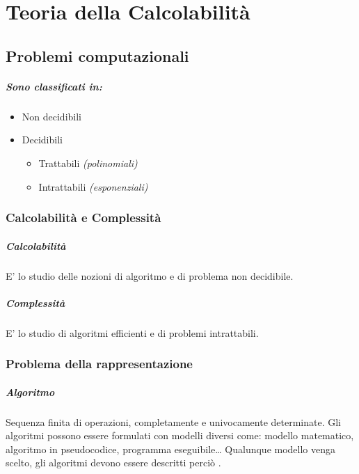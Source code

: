 \chapter{Teoria della Calcolabilità}
\section{Problemi computazionali}
\paragraph{Sono classificati in:}
\begin{itemize}
    \item Non decidibili
    \item Decidibili
    \begin{itemize}
        \item Trattabili \textit{(polinomiali)}
        \item Intrattabili \textit{(esponenziali)}
    \end{itemize}
\end{itemize}
\subsection{Calcolabilità e Complessità}
\paragraph{Calcolabilità} E' lo studio delle nozioni di algoritmo e di problema non decidibile.
\paragraph{Complessità} E' lo studio di algoritmi efficienti e di problemi intrattabili.
\subsection{Problema della rappresentazione}
\paragraph{Algoritmo}
Sequenza finita di operazioni, completamente e univocamente determinate.
Gli algoritmi possono essere formulati con modelli diversi come: modello matematico, algoritmo in pseudocodice, programma eseguibile\dots
Qualunque modello venga scelto, gli algoritmi devono essere descritti perciò .
